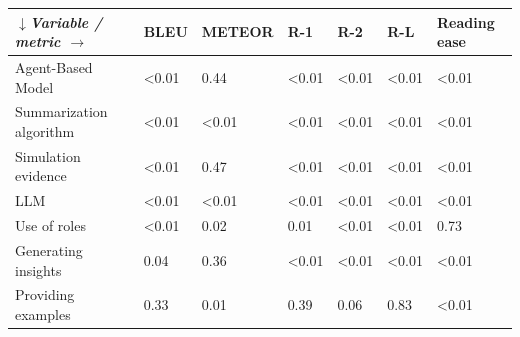 \begin{tabular}{|l|l|l|l|l|l|l|}
\hline
\textit{$\downarrow$Variable / metric $\rightarrow$} & BLEU & METEOR & R-1 & R-2 & R-L & Reading ease \\
 \hline
 Agent-Based Model & \textless{}0.01 & 0.44 & \textless{}0.01 & \textless{}0.01 & \textless{}0.01 & \textless{}0.01 \\
 \hline
 Summarization algorithm & \textless{}0.01 & \textless{}0.01 & \textless{}0.01 & \textless{}0.01 & \textless{}0.01 & \textless{}0.01 \\
 \hline
 Simulation evidence & \textless{}0.01 & 0.47 & \textless{}0.01 & \textless{}0.01 & \textless{}0.01 & \textless{}0.01 \\
 \hline
 LLM & \textless{}0.01 & \textless{}0.01 & \textless{}0.01 & \textless{}0.01 & \textless{}0.01 & \textless{}0.01 \\
 \hline
 Use of roles & \textless{}0.01 & 0.02 & 0.01 & \textless{}0.01 & \textless{}0.01 & 0.73 \\
 \hline
 Generating insights & 0.04 & 0.36 & \textless{}0.01 & \textless{}0.01 & \textless{}0.01 & \textless{}0.01 \\
 \hline
 Providing examples & 0.33 & 0.01 & 0.39 & 0.06 & 0.83 & \textless{}0.01 \\
\hline
\end{tabular}
